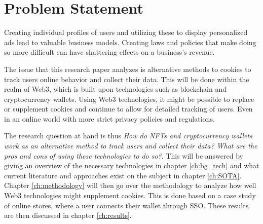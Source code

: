 \chapter{Problem Statement}
\label{ch:problem}

Creating individual profiles of users and utilizing these to display personalized ads lead to valuable business models. Creating laws and policies that make doing so more difficult can have shattering effects on a business's revenue.

The issue that this research paper analyzes is alternative methods to cookies to track users online behavior and collect their data. This will be done within the realm of Web3, which is built upon technologies such as blockchain and cryptocurrency wallets. Using Web3 technologies, it might be possible to replace or supplement cookies and continue to allow for detailed tracking of users. Even in an online world with more strict privacy policies and regulations.

The research question at hand is thus \textit{How do NFTs and cryptocurrency wallets work as an alternative method to track users and collect their data? What are the pros and cons of using these technologies to do so?}. This will be answered by giving an overview of the necessary technologies in chapter \ref{ch:bg_tech} and what current literature and approaches exist on the subject in chapter \ref{ch:SOTA}. Chapter \ref{ch:methodology} will then go over the methodology to analyze how well Web3 technologies might supplement cookies. This is done based on a case study of online stores, where a user connects their wallet through SSO. These results are then discussed in chapter \ref{ch:results}.